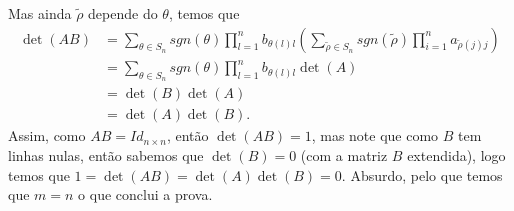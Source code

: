 \documentclass{article}
\begin{document}
Mas ainda $\tilde{\rho}$ depende do $\theta$, temos que
\begin{align*}
  \det(AB)&=\sum_{\theta\in S_n}sgn(\theta)\prod_{l=1}^{n}b_{\theta(l)l}\left(\sum_{\tilde{\rho}\in S_{n}}sgn(\tilde{\rho})\prod_{i=1}^{n}a_{\tilde{\rho}(j)j}\right)\\
  &=\sum_{\theta\in S_n}sgn(\theta)\prod_{l=1}^{n}b_{\theta(l)l}\det(A)\\
  &=\det(B)\det(A)\\
  &=\det(A)\det(B).
\end{align*}
Assim, como $AB=Id_{n\times n}$, então $\det(AB)=1$, mas note que como $B$ tem linhas nulas, então sabemos que $\det(B)=0$ (com a matriz $B$ extendida), logo temos que $1=\det(AB)=\det(A)\det(B)=0$. Absurdo, pelo que temos que $m=n$ o que conclui a prova.  
\end{document}
